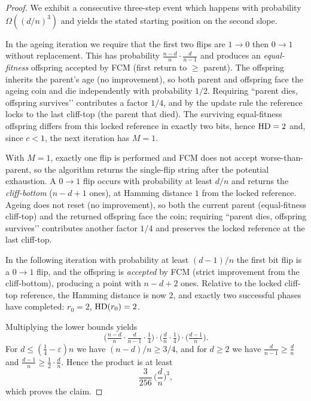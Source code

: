 \begin{proof}
	We exhibit a consecutive three-step event which happens with probability $\Omega((d/n)^3)$ and yields the stated starting 
	position on the second slope.
	
	 In the ageing iteration we require that the first two flips are $1\!\to 0$ then $0\!\to 1$ without replacement. This has probability $\frac{n-d}{n}\cdot\frac{d}{n-1}$ and produces an \emph{equal-fitness} offspring accepted by FCM (first return to $\ge$ parent). The offspring inherits the parent’s age (no improvement), so both parent and offspring face the ageing coin and die independently with probability $1/2$. Requiring “parent dies, offspring survives’’ contributes a factor $1/4$, and by the update rule the reference locks to the last cliff-top (the parent that died). The surviving equal-fitness offspring differs from this locked reference in exactly two bits, hence $\text{HD}=2$ and, since $c<1$, the next iteration has $M=1$.
		
 With $M=1$, exactly one flip is performed and FCM does not accept worse-than-parent, so the algorithm returns the single-flip string after the potential exhaustion. A $0\!\to 1$ flip occurs with probability at least $d/n$ and returns the \emph{cliff-bottom} ($n-d+1$ ones), at Hamming distance $1$ from the locked reference. Ageing does not reset (no improvement), so both the current parent (equal-fitness cliff-top) and the returned offspring face the coin; requiring “parent dies, offspring survives’’ contributes another factor $1/4$ and preserves the locked reference at the last cliff-top.
	
 In the following iteration with probability at least $(d-1)/n$ the first bit flip is a $0\!\to 1$ flip, and the offspring is \emph{accepted} by FCM (strict improvement from the cliff-bottom), producing a point with $n-d+2$ ones. Relative to the locked cliff-top reference, the Hamming distance is now $2$, and exactly two successful phases have completed: $r_0=2$, $\text{HD}(r_0)=2$.
	
	Multiplying the lower bounds yields
	\[
	\Big(\tfrac{n-d}{n}\cdot\tfrac{d}{n-1}\cdot\tfrac14\Big)\cdot
	\Big(\tfrac{d}{n}\cdot\tfrac14\Big)\cdot
	\Big(\tfrac{d-1}{n}\Big).
	\]
	For $d\le(\tfrac14-\varepsilon)n$ we have $(n-d)/n\ge 3/4$, and for $d\ge 2$ we have $\tfrac{d}{n-1}\ge\tfrac{d}{n}$ and $\tfrac{d-1}{n}\ge \tfrac12\cdot\tfrac{d}{n}$. Hence the product is at least
	\[
	\frac{3}{256}\,\Big(\frac{d}{n}\Big)^{\!3},
	\]
	which proves the claim.
\end{proof}

